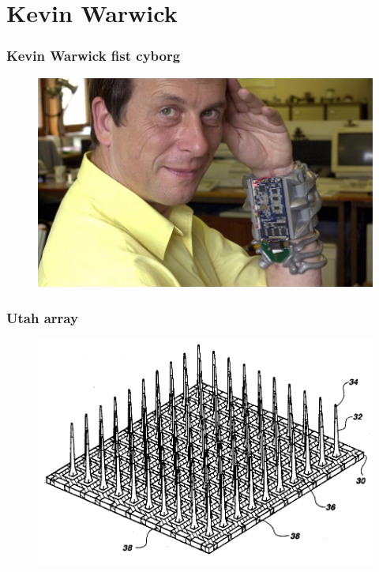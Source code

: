 \documentclass[12pt, aspectratio=169]{beamer}
\begin{document}
\section{Kevin Warwick}
\begin{frame}
  \frametitle{Kevin Warwick fist cyborg}
  \begin{figure}
    \includegraphics[width=0.7\linewidth]{Kevin-Warwick_2936650k}
  \end{figure}
\end{frame}


\begin{frame}
  \frametitle{Utah array}
  \begin{figure}
    \includegraphics[width=0.7\linewidth]{Utah_array_pat5215088}
  \end{figure}
\end{frame}

\end{document}
